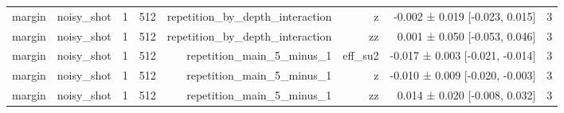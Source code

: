 \begin{table}
\begin{tabular}{lrrrrrrr}
margin & noisy\_shot & 1 & 512 & repetition\_by\_depth\_interaction & z & -0.002 ± 0.019 [-0.023, 0.015] & 3 \\
margin & noisy\_shot & 1 & 512 & repetition\_by\_depth\_interaction & zz & 0.001 ± 0.050 [-0.053, 0.046] & 3 \\
margin & noisy\_shot & 1 & 512 & repetition\_main\_5\_minus\_1 & eff\_su2 & -0.017 ± 0.003 [-0.021, -0.014] & 3 \\
margin & noisy\_shot & 1 & 512 & repetition\_main\_5\_minus\_1 & z & -0.010 ± 0.009 [-0.020, -0.003] & 3 \\
margin & noisy\_shot & 1 & 512 & repetition\_main\_5\_minus\_1 & zz & 0.014 ± 0.020 [-0.008, 0.032] & 3 \\
\bottomrule
\end{tabular}
\end{table}


